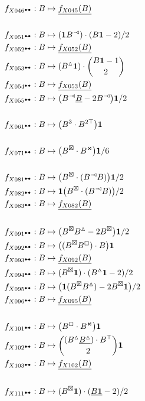 \documentclass{article}
\theoremstyle{plain}
\begin{document}
\begin{align*}
f_{X046^\dumbbell}: B&\mapsto \underline{f_{X045}(B)}\\
&\\%
f_{X051^\dumbbell}: B&\mapsto ({\bf 1}B^\arro)\cdot (B{\bf 1}-2)/2\\
f_{X052^\dumbbell}: B&\mapsto \underline{f_{X052}(B)}\\
f_{X053^\dumbbell}: B&\mapsto (B^\vartriangle{\bf 1})\cdot\binom{B{\bf 1}-1}{2}\\
f_{X054^\dumbbell}: B&\mapsto \underline{f_{X053}(B)}\\
f_{X055^\dumbbell}: B&\mapsto \big(B^\arro\underline{B}-2B^\arro\big){\bf 1}/2\\
&\\%
f_{X061^\dumbbell}: B&\mapsto \big(B^3\cdot B^{2\top}\big){\bf 1}\\
&\\%
f_{X071^\dumbbell}: B&\mapsto \big(B^\boxtimes\cdot B^{\Join}\big){\bf 1}/6\\
&\\%
f_{X081^\dumbbell}: B&\mapsto \big(B^\boxtimes\cdot (B^\arro B)\big){\bf 1}/2\\
f_{X082^\dumbbell}: B&\mapsto {\bf 1}\big(B^\boxtimes\cdot (B^\arro B)\big)/2\\
f_{X083^\dumbbell}: B&\mapsto \underline{f_{X082}(B)}\\
&\\%
f_{X091^\dumbbell}: B&\mapsto \big(B^\boxtimes B^\vartriangle-2B^\boxtimes\big){\bf 1}/2\\
f_{X092^\dumbbell}: B&\mapsto \big((B^\boxtimes B^\boxempty)\cdot B \big){\bf 1}\\
f_{X093^\dumbbell}: B&\mapsto \underline{f_{X092}(B)}\\
f_{X094^\dumbbell}: B&\mapsto (B^\boxtimes{\bf 1})\cdot (B^\vartriangle{\bf 1}-2)/2\\
f_{X095^\dumbbell}: B&\mapsto \big({\bf 1}(B^\boxtimes B^\vartriangle)-2B^\boxtimes{\bf 1}\big)/2\\
f_{X096^\dumbbell}: B&\mapsto \underline{f_{X095}(B)}\\
&\\%
f_{X101^\dumbbell}: B&\mapsto \big(B^\boxempty\cdot B^{\Join}\big){\bf 1}\\
f_{X102^\dumbbell}: B&\mapsto \binom{(B^\vartriangle \underline{B^\vartriangle})\cdot B^\top}{2}{\bf 1}\\
f_{X103^\dumbbell}: B&\mapsto \underline{f_{X102}(B)}\\
&\\%
f_{X111^\dumbbell}: B&\mapsto (B^\boxtimes{\bf 1})\cdot (\underline{B{\bf1}}-2)/2\\

\end{align*}
\end{document}
